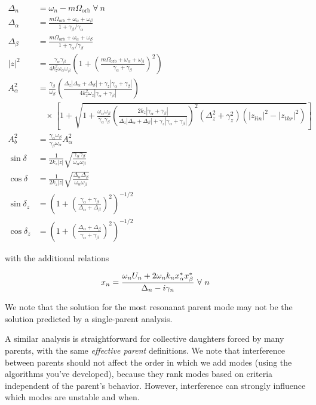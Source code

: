 \begin{subequations}
\begin{align}
\Delta_n & = \omega_n - m\Omega_\mathrm{orb} \ \forall\ n \\
\Delta_\alpha & = \frac{m\Omega_\mathrm{orb} + \omega_\alpha + \omega_\beta}{1 + \gamma_\beta/\gamma_\alpha} \\
\Delta_\beta & = \frac{m\Omega_\mathrm{orb} + \omega_\alpha + \omega_\beta}{1 + \gamma_\alpha/\gamma_\beta} \\
|z|^2 & = \frac{\gamma_\alpha\gamma_\beta}{4 k_z^2\omega_\alpha\omega_\beta}\left(1 + \left(\frac{m\Omega_\mathrm{orb} + \omega_\alpha + \omega_\beta}{\gamma_\alpha + \gamma_\beta}\right)^2 \right) \\
A_\alpha^2 & = \frac{\gamma_\beta}{\omega_\beta}\left(\frac{\Delta_z|\Delta_\alpha+\Delta_\beta|+\gamma_z|\gamma_\alpha+\gamma_\beta|}{4k_z^2\omega_z|\gamma_\alpha+\gamma_\beta|}\right) \\
    & \ \ \ \ \times \left[ 1 + \sqrt{ 1 + \frac{\omega_\alpha\omega_\beta}{\gamma_\alpha\gamma_\beta}\left( \frac{2k_z|\gamma_\alpha+\gamma_\beta|}{\Delta_z|\Delta_\alpha+\Delta_\beta|+\gamma_z|\gamma_\alpha+\gamma_\beta|}\right)^2 (\Delta_z^2 + \gamma_z^2) (\left|z_{lin}\right|^2 - \left|z_{thr}\right|^2) } \right ] \\
A_b^2 & = \frac{\gamma_\alpha\omega_\beta}{\gamma_\beta\omega_\alpha}A_\alpha^2 \\
\sin\delta & = \frac{1}{2k_z |z|}\sqrt{ \frac{\gamma_\alpha\gamma_\beta}{\omega_\alpha\omega_\beta} } \\
\cos\delta & = \frac{1}{2k_z |z|}\sqrt{ \frac{\Delta_\alpha\Delta_\beta}{\omega_\alpha\omega_\beta} } \\
\sin\delta_z & = \left( 1 + \left( \frac{\gamma_\alpha+\gamma_\beta}{\Delta_\alpha+\Delta_\beta}\right)^2 \right)^{-1/2} \\
\cos\delta_z & = \left( 1 + \left( \frac{\Delta_\alpha+\Delta_\beta}{\gamma_\alpha+\gamma_\beta}\right)^2 \right)^{-1/2}
\end{align}
\end{subequations}

with the additional relations

\begin{equation}
x_n = \frac{\omega_n U_n + 2\omega_n k_n x_\alpha^\ast x_\beta^\ast}{\Delta_n -i\gamma_n} \ \forall\  n\\
\end{equation}

We note that the solution for the most resonanat parent mode may not be the solution predicted by a single-parent analysis.

A similar analysis is straightforward for collective daughters forced by many parents, with the same \emph{effective parent} definitions. We note that interference between parents should not affect the order in which we add modes (using the algorithms you've developed), because they rank modes based on criteria independent of the parent's behavior. However, interference can strongly influence which modes are unstable and when.
